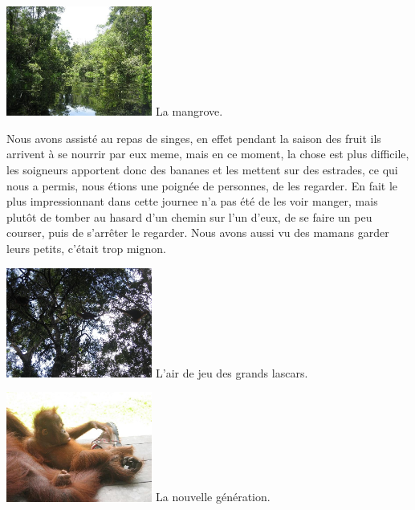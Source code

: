 \begin{multicols}{2}
\hspace*{-0.65cm}
\includegraphics[width=4.8cm]{articles/Borneo/1210332087kPql.jpg}
La mangrove.

Nous avons assisté au repas de singes, en effet pendant la saison des fruit ils arrivent à se nourrir par eux meme, mais en ce moment, la chose est plus difficile, les soigneurs apportent donc des bananes et les mettent sur des estrades, ce qui nous a permis, nous étions une poignée de personnes, de les regarder. En fait le plus impressionnant dans cette journee n'a pas été de les voir manger, mais plutôt de tomber au hasard d'un chemin sur l'un d'eux, de se faire un peu courser, puis de s'arrêter le regarder. Nous avons aussi vu des mamans garder leurs petits, c'était trop mignon.

\hspace*{-0.65cm}
\includegraphics[width=4.8cm]{articles/Borneo/1210332096AngR.jpg}
L'air de jeu des grands lascars.

\hspace*{-0.65cm}
\includegraphics[width=4.8cm]{articles/Borneo/1210332100Imld.jpg}
La nouvelle génération.


\end{multicols}


